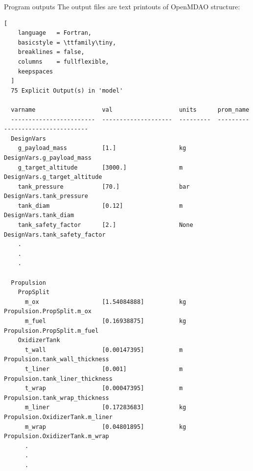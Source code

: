 \begin{frame}[fragile]{Program outputs}
  The output files are text printouts of OpenMDAO structure:

  \vspace{\baselineskip}

  \begin{minipage}{\textwidth}
  \begin{lstlisting}[
    language   = Fortran,
    basicstyle = \ttfamily\tiny,
    breaklines = false,
    columns    = fullflexible,
    keepspaces
  ]
  75 Explicit Output(s) in 'model'

  varname                   val                   units      prom_name
  ------------------------  --------------------  ---------  ---------------------------------
  DesignVars
    g_payload_mass          [1.]                  kg         DesignVars.g_payload_mass
    g_target_altitude       [3000.]               m          DesignVars.g_target_altitude
    tank_pressure           [70.]                 bar        DesignVars.tank_pressure
    tank_diam               [0.12]                m          DesignVars.tank_diam
    tank_safety_factor      [2.]                  None       DesignVars.tank_safety_factor
    .
    .
    .

  Propulsion
    PropSplit
      m_ox                  [1.54084888]          kg         Propulsion.PropSplit.m_ox
      m_fuel                [0.16938875]          kg         Propulsion.PropSplit.m_fuel
    OxidizerTank
      t_wall                [0.00147395]          m          Propulsion.tank_wall_thickness
      t_liner               [0.001]               m          Propulsion.tank_liner_thickness
      t_wrap                [0.00047395]          m          Propulsion.tank_wrap_thickness
      m_liner               [0.17283683]          kg         Propulsion.OxidizerTank.m_liner
      m_wrap                [0.04801895]          kg         Propulsion.OxidizerTank.m_wrap
      .
      .
      .
  \end{lstlisting}
  \end{minipage}
\end{frame}
